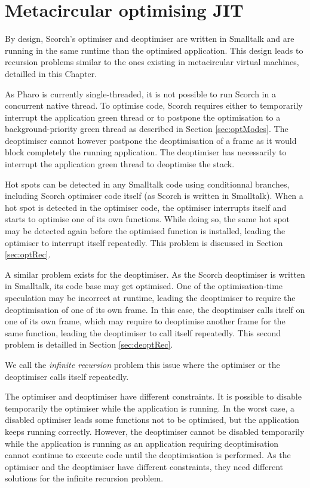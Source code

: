 \documentclass[a4paper,12pt,twoside]{../includes/ThesisStyle}
\begin{document}
\fi

\chapter{Metacircular optimising JIT}
\label{chap:metacircular}
\minitoc

By design, Scorch's optimiser and deoptimiser are written in Smalltalk and are running in the same runtime than the optimised application. This design leads to recursion problems similar to the ones existing in metacircular virtual machines, detailled in this Chapter. 

As Pharo is currently single-threaded, it is not possible to run Scorch in a concurrent native thread. To optimise code, Scorch requires either to temporarily interrupt the application green thread or to postpone the optimisation to a background-priority green thread as described in Section \ref{sec:optModes}. The deoptimiser cannot however postpone the deoptimisation of a frame as it would block completely the running application. The deoptimiser has necessarily to interrupt the application green thread to deoptimise the stack.

Hot spots can be detected in any Smalltalk code using conditionnal branches, including Scorch optimiser code itself (as Scorch is written in Smalltalk). When a hot spot is detected in the optimiser code, the optimiser interrupts itself and starts to optimise one of its own functions. While doing so, the same hot spot may be detected again before the optimised function is installed, leading the optimiser to interrupt itself repeatedly. This problem is discussed in Section \ref{sec:optRec}.

A similar problem exists for the deoptimiser. As the Scorch deoptimiser is written in Smalltalk, its code base may get optimised. One of the optimisation-time speculation may be incorrect at runtime, leading the deoptimiser to require the deoptimisation of one of its own frame. In this case, the deoptimiser calls itself on one of its own frame, which may require to deoptimise another frame for the same function, leading the deoptimiser to call itself repeatedly. This second problem is detailled in Section \ref{sec:deoptRec}.

We call the \emph{infinite recursion} problem this issue where the optimiser or the deoptimiser calls itself repeatedly.

The optimiser and deoptimiser have different constraints. It is possible to disable temporarily the optimiser while the application is running. In the worst case, a disabled optimiser leads some functions not to be optimised, but the application keeps running correctly. However, the deoptimiser cannot be disabled temporarily while the application is running as an application requiring deoptimisation cannot continue to execute code until the deoptimisation is performed. As the optimiser and the deoptimiser have different constraints, they need different solutions for the infinite recursion problem.
\end{document}
